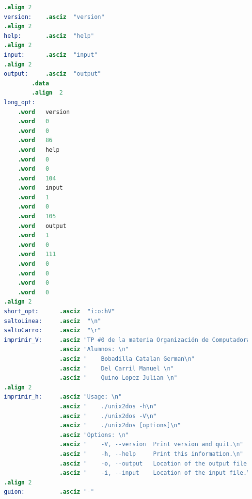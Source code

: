 \documentclass[a4paper]{article}
\begin{document}
\begin{lstlisting}[language=Assembler]
.align 2
version:	.asciz  "version"
.align 2
help:		.asciz  "help"
.align 2
input:		.asciz  "input"
.align 2
output:		.asciz  "output"
        .data
        .align  2
long_opt:
    .word   version
    .word   0
    .word   0
    .word   86
    .word   help
    .word   0
    .word   0
    .word   104
    .word   input
    .word   1
    .word   0
    .word   105
    .word   output
    .word   1
    .word   0
    .word   111
    .word   0
    .word   0
    .word   0
    .word   0
.align 2
short_opt:		.asciz  "i:o:hV"
saltoLinea:    	.asciz  "\n"
saltoCarro:    	.asciz  "\r"
imprimir_V:		.asciz "TP #0 de la materia Organización de Computadoras \n"
				.asciz "Alumnos: \n"
				.asciz "	Bobadilla Catalan German\n"
				.asciz "	Del Carril Manuel \n"
				.asciz "	Quino Lopez Julian \n"
.align 2
imprimir_h:		.asciz "Usage: \n"
	            .asciz "	./unix2dos -h\n"
	            .asciz "	./unix2dos -V\n"
	            .asciz "	./unix2dos [options]\n"
	            .asciz "Options: \n"
	            .asciz "	-V, --version  Print version and quit.\n"
	            .asciz "	-h, --help     Print this information.\n"
	            .asciz "	-o, --output   Location of the output file.\n"
	            .asciz "	-i, --input    Location of the input file.\n"
.align 2
guion:			.asciz "-"

\end{lstlisting}
\end{document}
